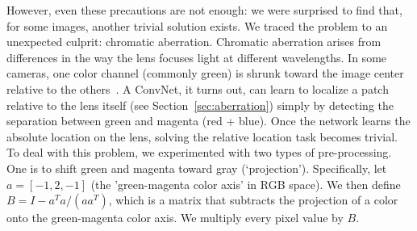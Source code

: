\documentclass[10pt,twocolumn,letterpaper]{article}
\newcommand{\todo}[1]{\textcolor{red}{TODO: #1}\PackageWarning{TODO:}{#1!}}
\begin{document}
However, even these precautions are not enough:
we were surprised to find that, for some images, another trivial solution exists.  We traced the problem to an unexpected culprit: chromatic aberration.
Chromatic aberration arises from differences in the way the lens focuses light at different wavelengths.
In some cameras, one color channel (commonly green) is shrunk toward the image center relative to the others~\cite[p.~76]{brewster1854treatise}.
A ConvNet, it turns out, can learn to localize a patch relative to the lens itself (see Section~\ref{sec:aberration}) simply by detecting the separation between green and magenta (red + blue).  Once the network learns the absolute location on the lens, solving the relative location task becomes trivial.
To deal with this problem, we experimented with two types of pre-processing.  One is to shift green and magenta toward gray (`projection').  Specifically, let $a=[-1,2,-1]$ (the 'green-magenta color axis' in RGB space).  We then define $B=I-a^{T}a/(aa^{T})$, which is a matrix that subtracts the projection of a color onto the green-magenta color axis.  We multiply every pixel value by $B$.
\end{document}
